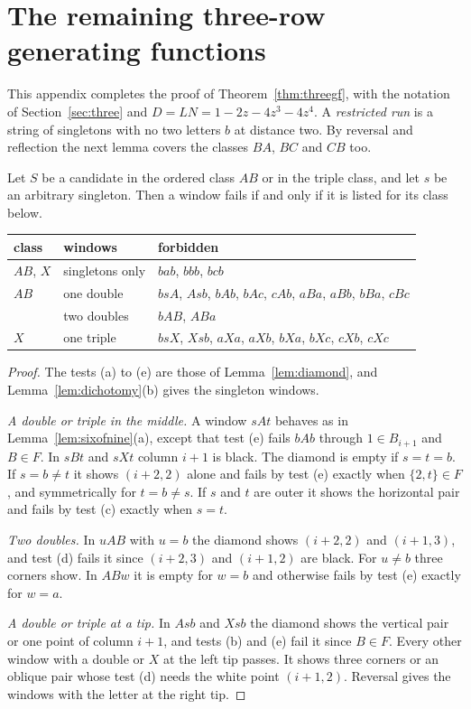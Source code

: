 \section{The remaining three-row generating functions}\label{app:threegf}

This appendix completes the proof of Theorem~\ref{thm:threegf}, with the notation of
Section~\ref{sec:three} and $D=LN=1-2z-4z^3-4z^4$. A \emph{restricted run} is a string of
singletons with no two letters $b$ at distance two. By reversal and reflection the next lemma covers the classes $BA$, $BC$ and $CB$ too.

\begin{lemma}\label{lem:threewindows}
Let $S$ be a candidate in the ordered class $AB$ or in the triple class, and let $s$ be an
arbitrary singleton. Then a window fails if and only if it is listed for its class below.
\begin{center}\small
\begin{tabular}{@{}lll@{}}
\toprule
class & windows & forbidden \\
\midrule
$AB$, $X$ & singletons only & $bab$, $bbb$, $bcb$ \\
$AB$ & one double & $bsA$, $Asb$, $bAb$, $bAc$, $cAb$, $aBa$, $aBb$, $bBa$, $cBc$ \\
 & two doubles & $bAB$, $ABa$ \\
$X$ & one triple & $bsX$, $Xsb$, $aXa$, $aXb$, $bXa$, $bXc$, $cXb$, $cXc$ \\
\bottomrule
\end{tabular}
\end{center}
\end{lemma}

\begin{proof}
The tests (a) to (e) are those of Lemma~\ref{lem:diamond}, and
Lemma~\ref{lem:dichotomy}(b) gives the singleton windows.

\emph{A double or triple in the middle.} A window $sAt$ behaves as in
Lemma~\ref{lem:sixofnine}(a), except that test (e) fails $bAb$ through $1\in B_{i+1}$ and
$B\in F$. In $sBt$ and $sXt$ column $i+1$ is black. The diamond is empty if $s=t=b$. If
$s=b\ne t$ it shows $(i+2,2)$ alone and fails by test (e) exactly when $\{2,t\}\in F$, and
symmetrically for $t=b\ne s$. If $s$ and $t$ are outer it shows the horizontal pair and fails
by test (c) exactly when $s=t$.

\emph{Two doubles.} In $uAB$ with $u=b$ the diamond shows $(i+2,2)$ and $(i+1,3)$, and test (d)
fails it since $(i+2,3)$ and $(i+1,2)$ are black. For $u\ne b$ three corners show. In $ABw$ it
is empty for $w=b$ and otherwise fails by test (e) exactly for $w=a$.

\emph{A double or triple at a tip.} In $Asb$ and $Xsb$ the diamond shows the vertical pair or
one point of column $i+1$, and tests (b) and (e) fail it since $B\in F$. Every other window
with a double or $X$ at the left tip passes. It shows three corners or an oblique pair whose
test (d) needs the white point $(i+1,2)$. Reversal gives the windows with the letter at the
right tip.
\end{proof}

